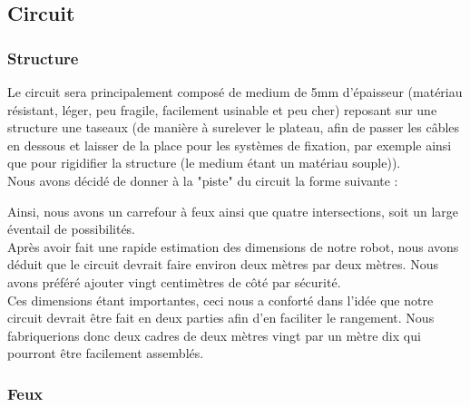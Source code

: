 \subsection{Circuit}

	\subsubsection{Structure}

		Le circuit sera principalement composé de medium de 5mm d'épaisseur (matériau résistant, léger, peu fragile, facilement usinable et peu cher) reposant sur une structure une taseaux (de manière à surelever le plateau, afin de passer les câbles en dessous et laisser de la place pour les systèmes de fixation, par exemple ainsi que pour rigidifier la structure (le medium étant un matériau souple)).\\

		Nous avons décidé de donner à la "piste" du circuit la forme suivante :


		Ainsi, nous avons un carrefour à feux ainsi que quatre intersections, soit un large éventail de possibilités.\\

		Après avoir fait une rapide estimation des dimensions de notre robot, nous avons déduit que le circuit devrait faire environ deux mètres par deux mètres.
		Nous avons préféré ajouter vingt centimètres de côté par sécurité.\\

		Ces dimensions étant importantes, ceci nous a conforté dans l'idée que notre circuit devrait être fait en deux parties afin d'en faciliter le rangement. Nous fabriquerions donc deux cadres de deux mètres vingt par un mètre dix qui pourront être facilement assemblés.

	\subsubsection{Feux}

